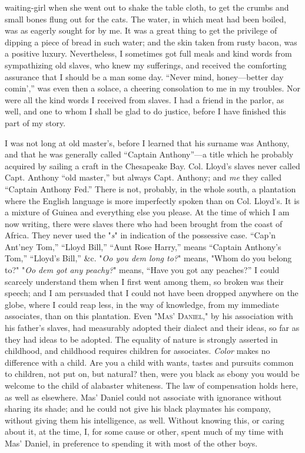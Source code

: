 waiting-girl when she went out to shake the table cloth, to get {}the
crumbs and small bones flung out for the cats. The water, in which meat
had been boiled, was as eagerly sought for by me. It was a great thing
to get the privilege of dipping a piece of bread in such water; and the
skin taken from rusty bacon, was a positive luxury. Nevertheless, I
sometimes got full meals and kind words from sympathizing old slaves,
who knew my sufferings, and received the comforting assurance that I
should be a man some day. ``Never mind, honey---better day comin','' was
even then a solace, a cheering consolation to me in my troubles. Nor
were all the kind words I received from slaves. I had a friend in the
parlor, as well, and one to whom I shall be glad to do justice, before I
have finished this part of my story.

I was not long at old master's, before I learned that his surname was
Anthony, and that he was generally called ``Captain Anthony''---a title
which he probably acquired by sailing a craft in the Chesapeake Bay.
Col. Lloyd's slaves never called Capt. Anthony ``old master,'' but
always Capt. Anthony; and \emph{me} they called ``Captain Anthony Fed.''
There is not, probably, in the whole south, a plantation where the
English language is more imperfectly spoken than on Col. Lloyd's. It is
a mixture of Guinea and everything else you please. At the time of which
I am now writing, there were slaves there who had been brought from the
coast of Africa. They never used the "\emph{s}" in indication of the
possessive case. ``Cap'n Ant'ney Tom,'' ``Lloyd Bill,'' ``Aunt Rose
Harry,'' means ``Captain Anthony's Tom,'' ``Lloyd's Bill,'' \&c.
"\emph{Oo you dem long to?}" means, "Whom do you {}belong to?" "\emph{Oo
dem got any peachy?}" means, ``Have you got any peaches?'' I could
scarcely understand them when I first went among them, so broken was
their speech; and I am persuaded that I could not have been dropped
anywhere on the globe, where I could reap less, in the way of knowledge,
from my immediate associates, than on this plantation. Even
"\textsc{Mas' Daniel}," by his association with his father's slaves, had
measurably adopted their dialect and their ideas, so far as they had
ideas to be adopted. The equality of nature is strongly asserted in
childhood, and childhood requires children for associates. \emph{Color}
makes no difference with a child. Are you a child with wants, tastes and
pursuits common to children, not put on, but natural? then, were you
black as ebony you would be welcome to the child of alabaster whiteness.
The law of compensation holds here, as well as elsewhere. Mas' Daniel
could not associate with ignorance without sharing its shade; and he
could not give his black playmates his company, without giving them his
intelligence, as well. Without knowing this, or caring about it, at the
time, I, for some cause or other, spent much of my time with Mas'
Daniel, in preference to spending it with most of the other boys.

